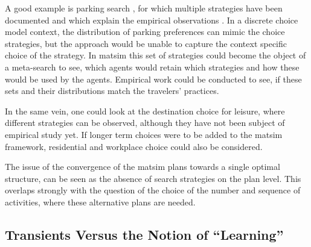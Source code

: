 A good example is parking search \citep[][]{Waraich_unpub_IATBR_2012}, for which multiple strategies have been documented and which explain the empirical observations \citep[][]{Shoup_2005}. 
In a discrete choice model context, the distribution of parking preferences can mimic the choice strategies, but the approach would be unable to capture the context specific choice of the strategy. 
In \gls{matsim} this set of strategies could become the object of a meta-search to see, which agents would retain which strategies and how these would be used by the agents. 
Empirical work could be conducted to see, if these sets and their distributions match the travelers' practices. 

In the same vein, one could look at the destination choice for leisure, where different strategies can be observed, although they have not been subject of empirical study yet. 
If longer term choices were to be added to the \gls{matsim} framework, residential and workplace choice could also be considered. 

The issue of the convergence of the \gls{matsim} plans towards a single optimal structure, can be seen as the absence of search strategies on the plan level. 
This overlaps strongly with the question of the choice of the number and sequence of activities, where these alternative plans are needed. 



\subsection{Transients Versus the Notion of \enquote{Learning}}
\label{sec:transients-vs-learning}


